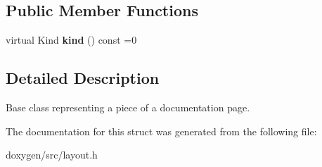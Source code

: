 \subsection*{Public Member Functions}
\begin{DoxyCompactItemize}
\item 
\mbox{\label{struct_layout_doc_entry_a26ca17b3f0f887a7901cee4fb81dace2}} 
virtual Kind {\bfseries kind} () const =0
\end{DoxyCompactItemize}


\subsection{Detailed Description}
Base class representing a piece of a documentation page. 

The documentation for this struct was generated from the following file\+:\begin{DoxyCompactItemize}
\item 
doxygen/src/layout.\+h\end{DoxyCompactItemize}
